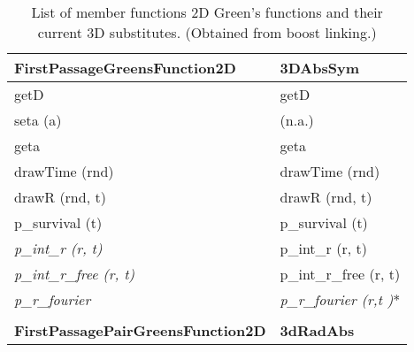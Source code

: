 \documentclass[a4paper,10pt]{article}
\begin{document}
\begin{table}[h!]
\caption{List of member functions 2D Green's functions and their current 3D substitutes. (Obtained from boost linking.)}
\label{table:memberfunctions}
\begin{tabular}{ p{} p{} }
  \textbf{FirstPassageGreensFunction2D} & \textbf{3DAbsSym} \\ \hline

    getD & getD \\
    seta (a) & (n.a.) \\
    geta & geta \\
    drawTime (rnd) & drawTime (rnd) \\
    drawR (rnd, t) & drawR (rnd, t) \\ \hline
    p\_survival (t) & p\_survival (t) \\
    
    \textit{p\_int\_r (r, t) } & p\_int\_r (r, t) \\
    \textit{p\_int\_r\_free (r, t)} & p\_int\_r\_free (r, t) \\
    \textit{p\_r\_fourier} & \textit{p\_r\_fourier (r,t )}*  \\ 

  & \\
  \textbf{FirstPassagePairGreensFunction2D} & \textbf{3dRadAbs} \\ \hline


\end{tabular}
\end{table}
\end{document}
